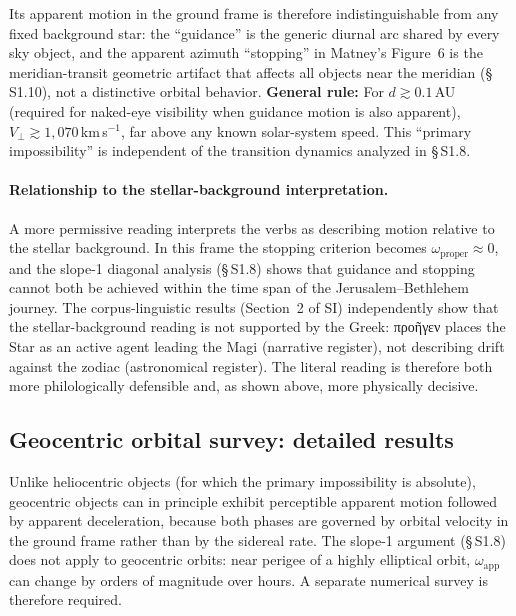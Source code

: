 \documentclass[11pt,a4paper]{article}
\newcommand{\grk}[1]{{\fontencoding{LGR}\selectfont #1}}
\newcommand{\grk}[1]{{\greekfont #1}}
\begin{document}
\begin{table}[h]
\begin{minipage}{0.9\linewidth}
    Its apparent motion in the ground frame is therefore indistinguishable from
    any fixed background star: the ``guidance'' is the generic diurnal arc
    shared by every sky object, and the apparent azimuth ``stopping'' in
    Matney's Figure~6 is the meridian-transit geometric artifact that affects
    all objects near the meridian (\S\,S1.10), not a distinctive orbital behavior.
    \textbf{General rule:} For $d \gtrsim 0.1$\,AU (required for naked-eye
    visibility when guidance motion is also apparent), $V_\perp \gtrsim
    1{,}070$\,km\,s$^{-1}$, far above any known solar-system speed.
    This ``primary impossibility'' is independent of the transition dynamics
    analyzed in \S\,S1.8.
  \end{minipage}
\end{table}

\paragraph{Relationship to the stellar-background interpretation.}
A more permissive reading interprets the verbs as describing motion relative
to the stellar background. In this frame the stopping criterion becomes
$\omega_\mathrm{proper} \approx 0$, and the slope-1 diagonal analysis
(\S\,S1.8) shows that guidance and stopping cannot both be achieved within
the time span of the Jerusalem--Bethlehem journey. The corpus-linguistic
results (Section~2 of SI) independently show that the stellar-background
reading is not supported by the Greek: \grk{προῆγεν} places the Star as
an active agent leading the Magi (narrative register), not describing drift
against the zodiac (astronomical register). The literal reading is
therefore both more philologically defensible and, as shown above, more
physically decisive.

\subsection{Geocentric orbital survey: detailed results}
\label{subsec:geocentric_detail}

Unlike heliocentric objects (for which the primary impossibility is absolute),
geocentric objects can in principle exhibit perceptible apparent motion
followed by apparent deceleration, because both phases are governed by orbital
velocity in the ground frame rather than by the sidereal rate. The slope-1
argument (\S\,S1.8) does not apply to geocentric orbits: near perigee of a
highly elliptical orbit, $\omega_\mathrm{app}$ can change by orders of
magnitude over hours. A separate numerical survey is therefore required.
\end{document}
